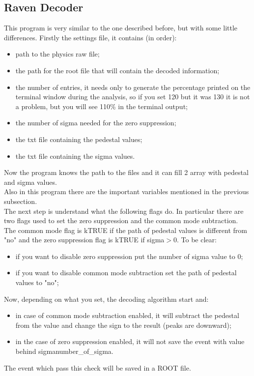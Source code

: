 \documentclass[a4paper,12pt]{article}
\begin{document}
	 	\subsection{Raven Decoder}
 			This program is very similar to the one described before, but with some little differences. Firstly the settings file, it contains (in order):
 			\begin{itemize}
 		 		\item path to the physics raw file;
 				\item the path for the root file that will contain the decoded information;
 				\item the number of entries, it needs only to generate the percentage printed on the terminal window during the analysis, so if you set 120 but it was 130 it is not a problem, but you will see 110\% in the terminal output;
 				\item the number of sigma needed for the zero suppression;
 				\item the txt file containing the pedestal values;
 				\item the txt file containing the sigma values.
 			\end{itemize} 
 			Now the program knows the path to the files and it can fill 2 array with pedestal and sigma values.\\
 			Also in this program there are the important variables mentioned in the previous subsection.\\
 			The next step is understand what the following flags do. In particular there are two flags used to set the zero suppression and the common mode subtraction. The common mode flag is kTRUE if the path of pedestal values is different from "no" and the zero suppression flag is kTRUE if sigma$>$0. 
 			To be clear:
 			\begin{itemize}
 				\item if you want to disable zero suppression put the number of sigma value to 0;
 				\item if you want to disable common mode subtraction set the path of pedestal values to "no";
 			\end{itemize}
 			Now, depending on what you set, the decoding algorithm start and:
 			\begin{itemize}
 				\item in case of common mode subtraction enabled, it will subtract the pedestal from the value and change the sign to the result (peaks are downward);
 		 		\item in the case of zero suppression enabled, it will not save the event with value behind sigma\*number\_of\_sigma.
 			\end{itemize} 
 			The event which pass this check will be saved in a ROOT file.
\end{document}
